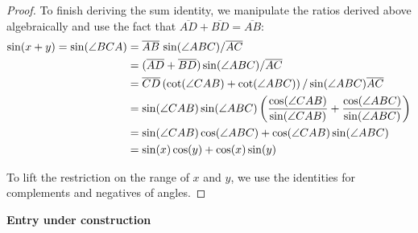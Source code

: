 \documentclass[12pt]{article}
\begin{document}
\begin{proof}
To finish deriving the sum identity, we manipulate the ratios derived above
algebraically and use the fact that $\overline{AD} + \overline{BD} = 
\overline{AB}$:
\begin{align*}
\sin (x + y) = \sin (\angle BCA) &=
\overline{AB} \, \sin (\angle ABC) / \overline{AC} \\ &=
(\overline{AD} + \overline{BD}) \sin (\angle ABC) / \overline{AC} \\ &=
\overline{CD} \left( \cot (\angle CAB) + \cot (\angle ABC) \right) / 
\sin (\angle ABC) \overline{AC}  \\ &=
\sin (\angle CAB) \sin (\angle ABC)
\left( {\cos (\angle CAB) \over \sin (\angle CAB)} +
{\cos (\angle ABC) \over \sin (\angle ABC)} \right) \\ &=
\sin (\angle CAB) \cos (\angle ABC) + 
\cos (\angle CAB) \sin (\angle ABC) \\ &=
\sin (x) \cos (y) + \cos (x) \sin (y)
\end{align*}

To lift the restriction on the range of $x$ and $y$, we use the identities
for complements and negatives of angles.  

\end{proof}

\textbf{Entry under construction}
\end{document}
